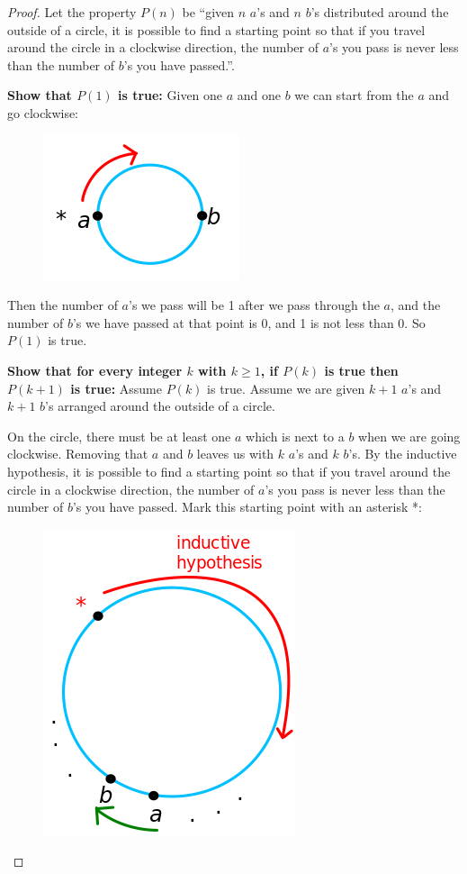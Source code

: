 \documentclass[14pt]{extarticle}
\begin{document}
\begin{proof}
Let the property $P(n)$ be ``given $n$ $a$'s and $n$ $b$'s distributed around the outside of a circle, it is possible to find a starting point so that if you travel around the circle in a clockwise direction, the number of $a$'s you pass is never less than the number of $b$'s you have passed.''.

{\bf Show that $P(1)$ is true:} Given one $a$ and one $b$ we can start from the $a$ and go clockwise:

\begin{figure}[ht!]
\centering
\includegraphics[scale=0.5]{../images/5.3.38.a.png}
\end{figure}

Then the number of $a$'s we pass will be 1 after we pass through the $a$, and the number of $b$'s we have passed at that point is 0, and 1 is not less than 0. So $P(1)$ is true.

{\bf Show that for every integer $k$ with $k \geq 1$, if $P(k)$ is true then $P(k+1)$ is true:} Assume $P(k)$ is true. Assume we are given $k+1$ $a$'s and $k+1$ $b$'s arranged around the outside of a circle.

On the circle, there must be at least one $a$ which is next to a $b$ when we are going clockwise. Removing that $a$ and $b$ leaves us with $k$ $a$'s and $k$ $b$'s. By the inductive hypothesis, it is possible to find a starting point so that if you travel around the circle in a clockwise direction, the number of $a$'s you pass is never less than the number of $b$'s you have passed. Mark this starting point with an asterisk *:

\begin{figure}[ht!]
\centering
\includegraphics[scale=0.5]{../images/5.3.38.b.png}
\end{figure}


\end{proof}
\end{document}
